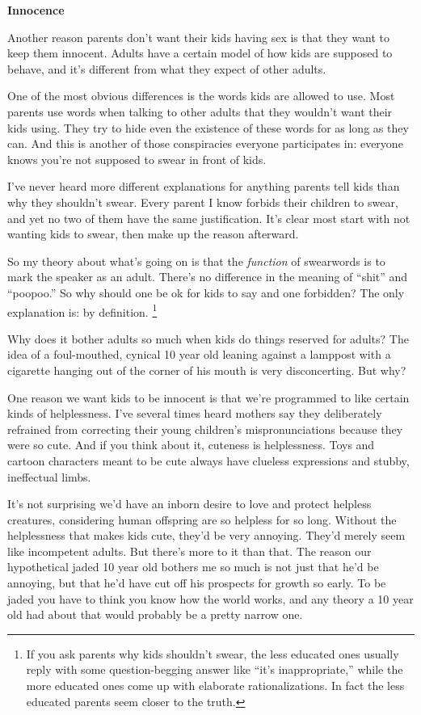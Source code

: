 \documentclass[12pt]{book}
\begin{document}
\textbf{Innocence}

Another reason parents don't want their kids having sex is that they
want to keep them innocent. Adults have a certain model of how kids are
supposed to behave, and it's different from what they expect of other
adults.

One of the most obvious differences is the words kids are allowed to
use. Most parents use words when talking to other adults that they
wouldn't want their kids using. They try to hide even the existence of
these words for as long as they can. And this is another of those
conspiracies everyone participates in: everyone knows you're not
supposed to swear in front of kids.

I've never heard more different explanations for anything parents tell
kids than why they shouldn't swear. Every parent I know forbids their
children to swear, and yet no two of them have the same justification.
It's clear most start with not wanting kids to swear, then make up the
reason afterward.

So my theory about what's going on is that the \emph{function} of
swearwords is to mark the speaker as an adult. There's no difference in
the meaning of ``shit'' and ``poopoo.'' So why should one be ok for kids
to say and one forbidden? The only explanation is: by definition.
\footnote{If you ask parents why kids shouldn't swear, the less educated
ones usually reply with some question-begging answer like ``it's
inappropriate,'' while the more educated ones come up with elaborate
rationalizations. In fact the less educated parents seem closer to the
truth.}

Why does it bother adults so much when kids do things reserved for
adults? The idea of a foul-mouthed, cynical 10 year old leaning against
a lamppost with a cigarette hanging out of the corner of his mouth is
very disconcerting. But why?

One reason we want kids to be innocent is that we're programmed to like
certain kinds of helplessness. I've several times heard mothers say they
deliberately refrained from correcting their young children's
mispronunciations because they were so cute. And if you think about it,
cuteness is helplessness. Toys and cartoon characters meant to be cute
always have clueless expressions and stubby, ineffectual limbs.

It's not surprising we'd have an inborn desire to love and protect
helpless creatures, considering human offspring are so helpless for so
long. Without the helplessness that makes kids cute, they'd be very
annoying. They'd merely seem like incompetent adults. But there's more
to it than that. The reason our hypothetical jaded 10 year old bothers
me so much is not just that he'd be annoying, but that he'd have cut off
his prospects for growth so early. To be jaded you have to think you
know how the world works, and any theory a 10 year old had about that
would probably be a pretty narrow one.
\end{document}
